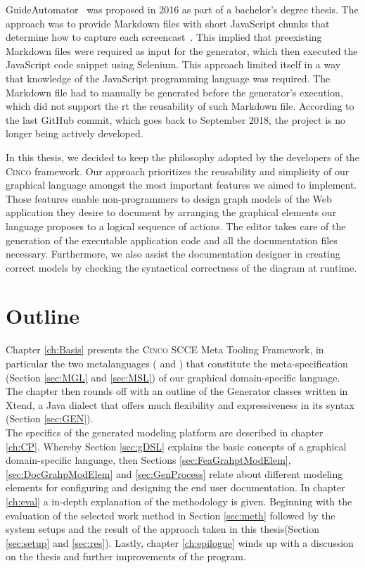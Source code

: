 GuideAutomator~\cite{oliveira2016guideautomator} was proposed in 2016 as part of a bachelor's degree thesis. The approach was to provide Markdown files with short JavaScript chunks that determine how to capture each screencast~\cite{guidAutomatorGitHub}. This implied that preexisting Markdown files were required as input for the generator, which then executed the JavaScript code snippet using Selenium. This approach limited itself in a way that knowledge of the JavaScript programming language was required. The Markdown file had to manually be generated before the generator's execution, which did not support the rt the reusability of such Markdown file. According to the last GitHub commit, which goes back to September 2018, the project is no longer being actively developed.

In this thesis, we decided to keep the philosophy adopted by the developers of the \textsc{Cinco} framework. Our approach prioritizes the reusability and simplicity of our graphical language amongst the most important features we aimed to implement. Those features enable non-programmers to design graph models of the Web application they desire to document by arranging the graphical elements our language proposes to a logical sequence of actions. The editor takes care of the generation of the executable application code and all the documentation files necessary. Furthermore, we also assist the documentation designer in creating correct models by checking the syntactical correctness of the diagram at runtime.

\section{Outline}\label{sec:outline}

Chapter \ref{ch:Basis} presents the \textsc{Cinco} SCCE Meta Tooling Framework, in particular the two metalanguages ( and ) that constitute the meta-specification (Section \ref{sec:MGL} and \ref{sec:MSL}) of our graphical domain-specific language. The chapter then rounds off with an outline of the Generator classes written in Xtend, a Java dialect that offers much flexibility and expressiveness in its syntax (Section \ref{sec:GEN}).\\The specifics of the generated modeling platform are described in chapter \ref{ch:CP}. Whereby Section \ref{sec:gDSL} explains the basic concepts of a graphical domain-specific language, then Sections \ref{sec:FeaGrahptModElem}, \ref{sec:DocGrahpModElem} and \ref{sec:GenProcess} relate about different modeling elements for configuring and designing the end user documentation. In chapter \ref{ch:eval} a in-depth explanation of the methodology is given. Beginning with the evaluation of the selected work method in Section \ref{sec:meth} followed by the system setups and the result of the approach taken in this thesis(Section \ref{sec:setup} and \ref{sec:res}). Lastly, chapter \ref{ch:epilogue} winds up with a discussion on the thesis and further improvements of the program.